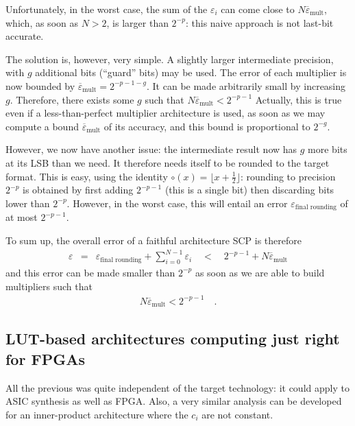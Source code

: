 \documentclass[twocolumn]{IEEEtran}
\newcommand{\abserr}{\varepsilon}
\newcommand{\maxerr}{\bound{\abserr}}
\newcommand{\bound}[1]{\overline{#1}}
\begin{document}
Unfortunately, in the worst case, the sum of the $\abserr_i$ can come close to $N\maxerr_{\text{mult}}$, which, as soon as $N>2$, is larger than $2^{-p}$:
this naive approach is not last-bit accurate.

The solution is, however, very simple. 
A slightly larger intermediate precision, with $g$ additional bits (``guard'' bits) may be used. 
The error of each multiplier is now bounded by $\maxerr_{\text{mult}}=2^{-p-1-g}$. 
It can be made arbitrarily small by increasing $g$.
Therefore, there exists some $g$ such that  $N\maxerr_{\text{mult}} <2^{-p-1}$
Actually, this is true even if a less-than-perfect multiplier architecture is used, as soon as we may compute a bound $\maxerr_{\text{mult}}$ of its accuracy,
and this bound is proportional to  $2^{-g}$. 

However, we now have another issue: the intermediate result now has $g$ more bits at its LSB than we need. 
It therefore needs itself to be rounded to the target format.
This is easy, using the identity $\circ(x)=\lfloor x+\frac{1}{2}\rfloor$:
rounding to precision  $2^{-p}$ is obtained by first adding $2^{-p-1}$ (this is a single bit) then discarding bits lower than $2^{-p}$.
However, in the worst case, this will entail an error $\abserr_{\text{final rounding}}$ of at most $2^{-p-1}$.

To sum up, the overall error of a faithful architecture SCP is therefore  
\begin{eqnarray}
  \label{eq:globalerrorfinal}
  \abserr &= & {\abserr_{\text{final rounding}}} + \sum_{i=0}^{N-1} \abserr_i 
  \quad <  \quad 2^{-p-1} + N\maxerr_{\text{mult}}
\end{eqnarray}
and this error can be made smaller than $2^{-p}$ as soon as we are able to build multipliers such that 
\begin{eqnarray}
  \label{eq:epsmultconstraint}
  N\maxerr_{\text{mult}} <2^{-p-1} \quad .
\end{eqnarray}







\subsection{LUT-based architectures computing just right for FPGAs}



All the previous was quite independent of the target technology: it could apply to ASIC synthesis as well as FPGA.
Also, a very similar analysis can be developed for an inner-product architecture where the $c_i$ are not constant. 
\end{document}
